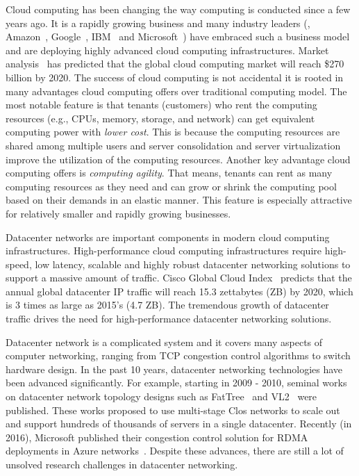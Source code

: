 
Cloud computing has been changing the way computing is conducted since a few years ago.
It is a rapidly growing business and many industry leaders
(\eg{}, Amazon~\cite{amazon-aws}, Google~\cite{google-compute}, 
IBM~\cite{ibm-softlayer,ibm-bluemix} and
Microsoft~\cite{microsoft-azure}) have embraced such a
business model and are deploying highly advanced cloud computing infrastructures.
Market analysis~\cite{cloud-market2020}
has predicted that the global cloud computing market will
reach \$270 billion by 2020. The success of cloud computing is
not accidental \textemdash\xspace it is rooted in many advantages cloud computing offers
over traditional computing model. The most notable feature is that tenants
(customers) who rent the computing resources (e.g., CPUs, memory, storage, and network) can get equivalent computing power
with \emph{lower cost}. This is because the computing resources are shared among multiple users and
server consolidation and server virtualization improve the utilization
of the computing resources. Another key advantage cloud computing offers
is \emph{computing agility}. That means, tenants can rent as many computing
resources as they need and can grow or shrink the computing pool based on their demands 
in an elastic manner.
This feature is especially attractive for relatively smaller and
rapidly growing businesses.

Datacenter networks are important components in modern cloud computing infrastructures. 
High-performance cloud computing infrastructures require high-speed, low latency, scalable and 
highly robust datacenter networking solutions to support a massive amount of traffic. 
Cisco Global Cloud Index~\cite{cisco-predict} predicts that the annual global datacenter IP traffic will 
reach 15.3 zettabytes (ZB) by 2020, which is 3 times as large as 2015's (4.7 ZB). 
The tremendous growth of datacenter traffic drives the need for high-performance 
datacenter networking solutions. 

Datacenter network is a complicated system and it covers many 
aspects of computer networking, ranging from TCP congestion control algorithms to switch hardware design. 
In the past 10 years, datacenter networking technologies have been advanced significantly. 
For example, starting in 2009 - 2010, seminal works on datacenter network topology designs such as 
FatTree~\cite{fattree} and VL2~\cite{vl2} were published. 
These works proposed to use multi-stage Clos networks to 
scale out and support hundreds of thousands of servers in a single datacenter. 
Recently (in 2016), Microsoft published their congestion control solution for 
RDMA deployments in Azure networks~\cite{zhu2015congestion}. 
Despite these advances, there are still a lot of unsolved research challenges in datacenter networking.

